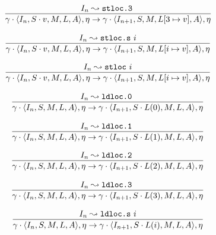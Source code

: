 \documentclass{article}
\numberwithin{equation}{section}
\newcommand{\mstate}[5] {
	\langle#1, #2, #3, #4, #5\rangle
}
\newcommand{\ipointsto}[3] {
	#1 \leadsto \texttt{#2} \text{ } #3
}
\newcommand{\setarrayitem}[3] {
	#1[#2 \mapsto #3]
}
\begin{document}
\begin{equation}
\label{eq:semantics_stloc3}
	\infer{
		\gamma \cdot \mstate{I_n}{S \cdot v}{M}{L}{A}, \eta
			\rightarrow
		\gamma \cdot \mstate{I_{n+1}}{S}{M}{\setarrayitem{L}{3}{v}}{A}, \eta
	}
	{\ipointsto{I_n}{stloc.3}}
\end{equation}

\begin{equation}
\label{eq:semantics_stlocs}
	\infer{
		\gamma \cdot \mstate{I_n}{S \cdot v}{M}{L}{A}, \eta
			\rightarrow
		\gamma \cdot \mstate{I_{n+1}}{S}{M}{\setarrayitem{L}{i}{v}}{A}, \eta
	}
	{\ipointsto{I_n}{stloc.s}{i}}
\end{equation}

\begin{equation}
\label{eq:semantics_stloc}
	\infer{
		\gamma \cdot \mstate{I_n}{S \cdot v}{M}{L}{A}, \eta
			\rightarrow
		\gamma \cdot \mstate{I_{n+1}}{S}{M}{\setarrayitem{L}{i}{v}}{A}, \eta
	}
	{\ipointsto{I_n}{stloc}{i}}
\end{equation}

\begin{equation}
\label{eq:semantics_ldloc0}
	\infer{
		\gamma \cdot \mstate{I_n}{S}{M}{L}{A}, \eta
			\rightarrow
		\gamma \cdot \mstate{I_{n+1}}{S \cdot L(0)}{M}{L}{A}, \eta
	}
	{\ipointsto{I_n}{ldloc.0}}
\end{equation}

\begin{equation}
\label{eq:semantics_ldloc1}
	\infer{
		\gamma \cdot \mstate{I_n}{S}{M}{L}{A}, \eta
			\rightarrow
		\gamma \cdot \mstate{I_{n+1}}{S \cdot L(1)}{M}{L}{A}, \eta
	}
	{\ipointsto{I_n}{ldloc.1}}
\end{equation}

\begin{equation}
\label{eq:semantics_ldloc2}
	\infer{
		\gamma \cdot \mstate{I_n}{S}{M}{L}{A}, \eta
			\rightarrow
		\gamma \cdot \mstate{I_{n+1}}{S \cdot L(2)}{M}{L}{A}, \eta
	}
	{\ipointsto{I_n}{ldloc.2}}
\end{equation}

\begin{equation}
\label{eq:semantics_ldloc3}
	\infer{
		\gamma \cdot \mstate{I_n}{S}{M}{L}{A}, \eta
			\rightarrow
		\gamma \cdot \mstate{I_{n+1}}{S \cdot L(3)}{M}{L}{A}, \eta
	}
	{\ipointsto{I_n}{ldloc.3}}
\end{equation}

\begin{equation}
\label{eq:semantics_ldlocs}
	\infer{
		\gamma \cdot \mstate{I_n}{S}{M}{L}{A}, \eta
			\rightarrow
		\gamma \cdot \mstate{I_{n+1}}{S \cdot L(i)}{M}{L}{A}, \eta
	}
	{\ipointsto{I_n}{ldloc.s}{i}}
\end{equation}
\end{document}
